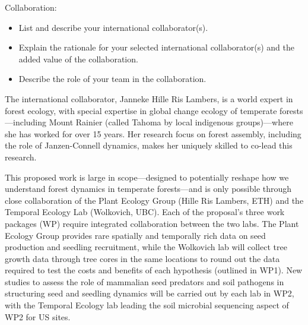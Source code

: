 \documentclass[12pt,oneside]{article}
\newenvironment{smitemize}{
\begin{itemize}
  \setlength{\itemsep}{1pt}
  \setlength{\parskip}{0pt}
  \setlength{\parsep}{0pt}}
{\end{itemize}
}
\begin{document}
{\sc Collaboration:} %
\vspace{-1ex}
\begin{smitemize}
\item List and describe your international collaborator(s).
\item Explain the rationale for your selected international collaborator(s) and the added value of the collaboration.
\item Describe the role of your team in the collaboration.
\end{smitemize}
The international collaborator, Janneke Hille Ris Lambers, is a world expert in forest ecology,\cite{clark1999seed,hille2005implications,ettinger2013climate,hillerislambers2013will,ford2017competition,buckley2019temperate,ford2020soil} with special expertise in global change ecology of temperate forests---including Mount Rainier (called Tahoma by local indigenous groups)---where she has worked for over 15 years.\cite{ettinger2011climate,anderegg2016drought,ford2017competition,ford2020soil} Her research focus on forest assembly, including the role of Janzen-Connell dynamics,\cite{hille2002density} makes her uniquely skilled to co-lead this research. %

This proposed work is large in scope---designed to potentially reshape how we understand forest dynamics in temperate forests---and is only possible through close collaboration of the Plant Ecology Group (Hille Ris Lambers, ETH) and the Temporal Ecology Lab (Wolkovich, UBC). Each of the proposal's three work packages (WP) require integrated collaboration between the two labs. The Plant Ecology Group provides rare spatially and temporally rich data on seed production and seedling recruitment, while the Wolkovich lab will collect tree growth data through tree cores in the same locations to round out the data required to test the costs and benefits of each hypothesis (outlined in WP1). New studies to assess the role of mammalian seed predators and soil pathogens in structuring seed and seedling dynamics will be carried out by each lab in WP2, with the Temporal Ecology lab leading the soil microbial sequencing aspect of WP2 for US sites. 
\end{document}
